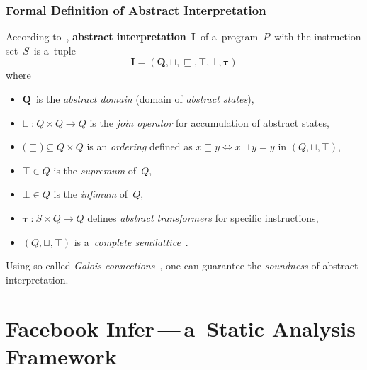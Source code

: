 \subsubsection{Formal Definition of Abstract Interpretation}

According to~\cite{AILatticeModelCousot, savAI},
\textbf{abstract interpretation}~$ \boldsymbol{I} $~of a~program~$ P $~with
the instruction set~$ S $~is a~tuple
$$ \boldsymbol{I = (Q, \sqcup, \sqsubseteq, \top, \bot, \tau)} $$
where
\begin{itemize}
    \item
        $ \boldsymbol{Q} $~is the \emph{abstract domain} (domain of
        \emph{abstract states}),

    \item
        $ \boldsymbol{\sqcup}~\text{:}~Q \times Q \rightarrow Q $
        is the \emph{join operator} for accumulation of abstract states,

    \item
        $ \text{(}\boldsymbol{\sqsubseteq}\text{)} \subseteq Q \times Q $ is
        an \emph{ordering} defined as
        $ x \sqsubseteq y \Leftrightarrow x \sqcup y = y $ in
        $ (Q, \sqcup, \top) $,

    \item
        $ \boldsymbol{\top} \in Q $ is the \emph{supremum} of~$ Q $,

    \item
        $ \boldsymbol{\bot} \in Q $ is the \emph{infimum} of~$ Q $,

    \item
        $ \boldsymbol{\tau}~\text{:}~S \times Q \rightarrow Q $
        defines \emph{abstract transformers} for specific instructions,

    \item
        $ (Q, \sqcup, \top) $ is a~\emph{complete
        semilattice}~\cite{savLatticesAndFixpoints, savAI}.
\end{itemize}

Using so-called \emph{Galois connections}~\cite{programAnalysisNielson,
wideningNarrowingCousot, savAI, AICousotWeb}, one can guarantee the
\emph{soundness} of abstract interpretation.


\section{\texorpdfstring{Facebook Infer\,---\,a~Static Analysis Framework}{%
    Facebook Infer - a~Static Analysis Framework%
}}
\label{sec:fbinfer}

